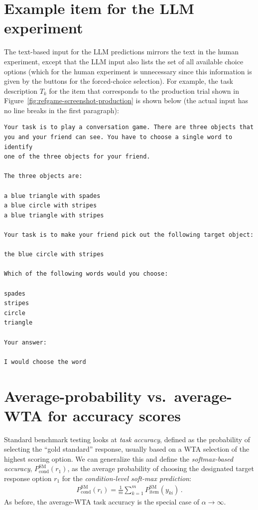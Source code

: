 \documentclass[fleqn]{article}
\begin{document}
\section{Example item for the LLM experiment}
\label{sec:examples-items-llm}

The text-based input for the LLM predictions mirrors the text in the human experiment, except that the LLM input also lists the set of all available choice options (which for the human experiment is unnecessary since this information is given by the buttons for the forced-choice selection).
For example, the task description $T_{k}$ for the item that corresponds to the production trial shown in Figure~\ref{fig:refgame-screenshot-production} is shown below (the actual input has no line breaks in the first paragraph):

\begin{verbatim}
Your task is to play a conversation game. There are three objects that
you and your friend can see. You have to choose a single word to identify
one of the three objects for your friend.

The three objects are:

a blue triangle with spades
a blue circle with stripes
a blue triangle with stripes

Your task is to make your friend pick out the following target object:

the blue circle with stripes

Which of the following words would you choose:

spades
stripes
circle
triangle

Your answer:

I would choose the word
\end{verbatim}

\section{Average-probability vs.~average-WTA for accuracy scores}
\label{sec:aver-prob-vs}

Standard benchmark testing looks at \emph{task accuracy}, defined as the probability of selecting the ``gold standard'' response, usually based on a WTA selection of the highest scoring option.
We can generalize this and define the \emph{softmax-based accuracy}, $P_{\text{cond}}^{\text{SM}}\left(r_{1} \right)$, as the average probability of choosing the designated target response option $r_{1}$ for the \emph{condition-level soft-max prediction}:
\begin{align*}
  P_{\text{cond}}^{\text{SM}}\left(r_{i} \right) = \frac{1}{m} \sum_{k = 1}^{m} P_{\text{item}}^{\text{SM}} \left(y_{ki} \right)\,.
\end{align*}
As before, the average-WTA task accuracy is the special case of $\alpha \rightarrow\infty$.
\end{document}
